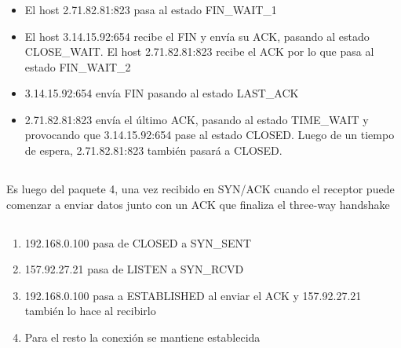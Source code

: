 \subsubsection{}
\begin{itemize}
\item El host 2.71.82.81:823 pasa al estado FIN\_WAIT\_1
\item El host 3.14.15.92:654 recibe el FIN y envía su ACK, pasando al estado
CLOSE\_WAIT. El host 2.71.82.81:823 recibe el ACK por lo que pasa al estado
FIN\_WAIT\_2
\item 3.14.15.92:654 envía FIN pasando al estado LAST\_ACK
\item 2.71.82.81:823 envía el último ACK, pasando al estado TIME\_WAIT y
provocando que 3.14.15.92:654 pase al estado CLOSED. Luego de un tiempo de
espera, 2.71.82.81:823 también pasará a CLOSED.
\end{itemize}

\setcounter{subsection}{9}
\subsection{}
\setcounter{subsubsection}{1}
\subsubsection{}
Es luego del paquete 4, una vez recibido en SYN/ACK cuando el receptor puede
comenzar a enviar datos junto con un ACK que finaliza el three-way handshake

\subsection{}
\subsubsection{}
\begin{enumerate}
\item 192.168.0.100 pasa de CLOSED a SYN\_SENT
\item 157.92.27.21 pasa de LISTEN a SYN\_RCVD
\item 192.168.0.100 pasa a ESTABLISHED al enviar el ACK y 157.92.27.21 también
lo hace al recibirlo
\item Para el resto la conexión se mantiene establecida
\end{enumerate}

\subsection{}
